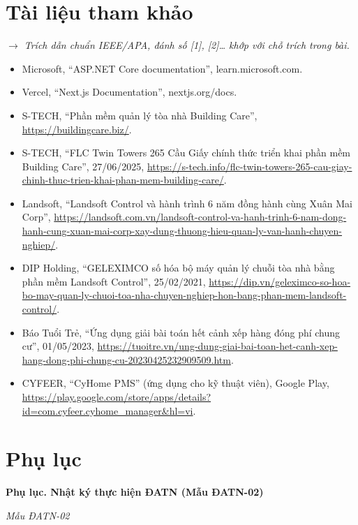 \chapter*{Tài liệu tham khảo}
\textit{$\rightarrow$ Trích dẫn chuẩn IEEE/APA, đánh số [1], [2]\ldots{} khớp với chỗ trích trong bài.}

\begin{itemize}[leftmargin=1.4em,itemsep=1pt,topsep=2pt]
  \item Microsoft, ``ASP.NET Core documentation'', learn.microsoft.com.
  \item Vercel, ``Next.js Documentation'', nextjs.org/docs.
  \item S-TECH, ``Phần mềm quản lý tòa nhà Building Care'', \url{https://buildingcare.biz/}.
  \item S-TECH, ``FLC Twin Towers 265 Cầu Giấy chính thức triển khai phần mềm Building Care'', 27/06/2025, \url{https://s-tech.info/flc-twin-towers-265-cau-giay-chinh-thuc-trien-khai-phan-mem-building-care/}.
  \item Landsoft, ``Landsoft Control và hành trình 6 năm đồng hành cùng Xuân Mai Corp'', \url{https://landsoft.com.vn/landsoft-control-va-hanh-trinh-6-nam-dong-hanh-cung-xuan-mai-corp-xay-dung-thuong-hieu-quan-ly-van-hanh-chuyen-nghiep/}.
  \item DIP Holding, ``GELEXIMCO số hóa bộ máy quản lý chuỗi tòa nhà bằng phần mềm Landsoft Control'', 25/02/2021, \url{https://dip.vn/geleximco-so-hoa-bo-may-quan-ly-chuoi-toa-nha-chuyen-nghiep-hon-bang-phan-mem-landsoft-control/}.
  \item Báo Tuổi Trẻ, ``Ứng dụng giải bài toán hết cảnh xếp hàng đóng phí chung cư'', 01/05/2023, \url{https://tuoitre.vn/ung-dung-giai-bai-toan-het-canh-xep-hang-dong-phi-chung-cu-20230425232909509.htm}.
  \item CYFEER, ``CyHome PMS'' (ứng dụng cho kỹ thuật viên), Google Play, \url{https://play.google.com/store/apps/details?id=com.cyfeer.cyhome_manager&hl=vi}.
\end{itemize}
\chapter*{Phụ lục}
\textbf{Phụ lục. Nhật ký thực hiện ĐATN (Mẫu ĐATN-02)}

\textit{Mẫu ĐATN-02}

